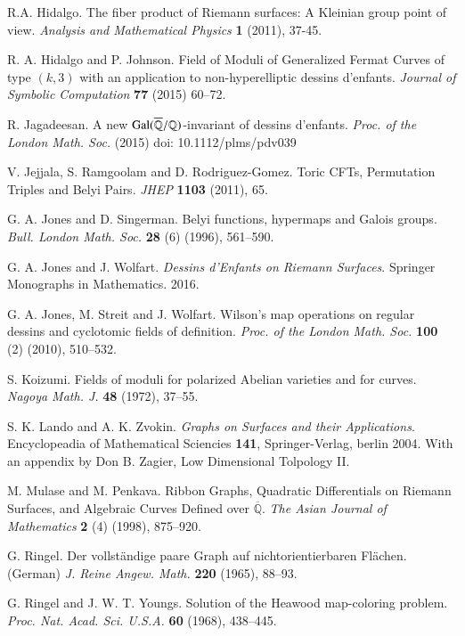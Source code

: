 \documentclass[12pt]{amsart}
\theoremstyle{remark}
\begin{document}
\begin{thebibliography}{99}
R.A. Hidalgo.
The fiber product of Riemann surfaces: A Kleinian group point of view.
{\it Analysis and Mathematical Physics} {\bf 1} (2011), 37-45.

R. A. Hidalgo and P. Johnson.
Field of Moduli of Generalized Fermat Curves of type $(k,3)$ with an application to non-hyperelliptic dessins d'enfants.
{\it Journal of Symbolic Computation} {\bf 77} (2015) 60--72.

R. Jagadeesan.
A new ${\rm Gal}(\overline{\mathbb Q}/{\mathbb Q})$-invariant of dessins d'enfants.
{\it Proc. of the London Math. Soc.} (2015) doi: 10.1112/plms/pdv039

V. Jejjala, S. Ramgoolam and D. Rodriguez-Gomez.
Toric CFTs, Permutation Triples and Belyi Pairs.
{\it JHEP} {\bf 1103} (2011), 65.

G. A. Jones and D. Singerman.
Belyi functions, hypermaps and Galois groups.
{\it Bull. London Math. Soc.} {\bf 28} (6) (1996), 561--590.

G. A. Jones and J. Wolfart.
{\it Dessins d'Enfants on Riemann Surfaces}.
Springer Monographs in Mathematics. 2016.

G. A. Jones, M. Streit and J. Wolfart.
Wilson's map operations on regular dessins and cyclotomic fields of definition.
{\it Proc. of the London Math. Soc.} {\bf 100} (2) (2010), 510--532.

S. Koizumi.
Fields of moduli for polarized Abelian varieties and for curves.
{\it Nagoya Math. J.} {\bf 48} (1972), 37--55.

S. K. Lando and A. K. Zvokin.
{\it Graphs on Surfaces and their Applications}. Encyclopeadia of Mathematical Sciencies {\bf 141}, Springer-Verlag, berlin 2004. With an appendix by Don B. Zagier, Low Dimensional Tolpology II.

M. Mulase and M. Penkava.
Ribbon Graphs, Quadratic Differentials on Riemann Surfaces, and Algebraic Curves Defined over $\overline{\mathbb Q}$.
{\it The Asian Journal of Mathematics} {\bf 2} (4) (1998), 875--920.

G. Ringel.
Der vollst\"andige paare Graph auf nichtorientierbaren Fl\"achen. (German) 
{\it J. Reine Angew. Math.} {\bf 220} (1965), 88--93. 

G. Ringel and J. W. T.  Youngs. 
Solution of the Heawood map-coloring problem. 
{\it Proc. Nat. Acad. Sci. U.S.A.} {\bf 60} (1968), 438--445.


\end{thebibliography}
\end{document}
